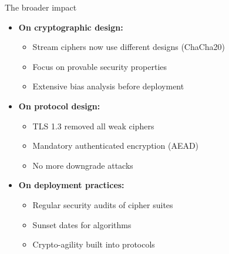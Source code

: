 \documentclass[aspectratio=169, lualatex, handout]{beamer}
\begin{document}
\begin{frame}{The broader impact}
	\begin{itemize}[<+->]
		\item \textbf{On cryptographic design:}
		      \begin{itemize}[<+->]
			      \item Stream ciphers now use different designs (ChaCha20)
			      \item Focus on provable security properties
			      \item Extensive bias analysis before deployment
		      \end{itemize}
		\item \textbf{On protocol design:}
		      \begin{itemize}[<+->]
			      \item TLS 1.3 removed all weak ciphers
			      \item Mandatory authenticated encryption (AEAD)
			      \item No more downgrade attacks
		      \end{itemize}
		\item \textbf{On deployment practices:}
		      \begin{itemize}[<+->]
			      \item Regular security audits of cipher suites
			      \item Sunset dates for algorithms
			      \item Crypto-agility built into protocols
		      \end{itemize}
	\end{itemize}
\end{frame}
\end{document}
